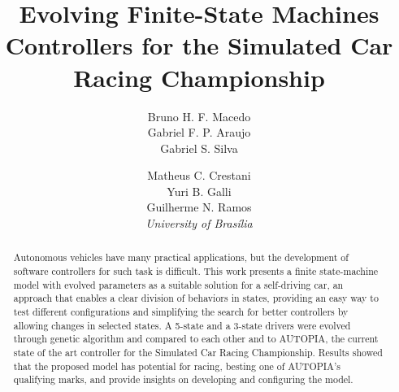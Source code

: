 \documentclass[a4paper]{sbgames}
\title{Evolving Finite-State Machines Controllers for the Simulated Car Racing Championship}
\author{Bruno H. F. Macedo\\Gabriel F. P. Araujo\\Gabriel S. Silva\\\and Matheus C. Crestani\\Yuri B. Galli\\Guilherme N. Ramos\\\hspace{-12em}\textit{University of Bras\'{i}lia}}
\begin{document}
	\maketitle

	\begin{abstract}
		Autonomous vehicles have many practical applications, but the development of software controllers for such task is difficult. This work presents a finite state-machine model with evolved parameters as a suitable solution for a self-driving car, an approach that enables a clear division of behaviors in states, providing an easy way to test different configurations and simplifying the search for better controllers by allowing changes in selected states. A 5-state and a 3-state drivers were evolved through genetic algorithm and compared to each other and to AUTOPIA, the current state of the art controller for the Simulated Car Racing Championship. Results showed that the proposed model has potential for racing, besting one of AUTOPIA's qualifying marks, and provide insights on developing and configuring the model.
	\end{abstract}

	\keywordlist
	\contactlist

	
	


	
	
\end{document}
